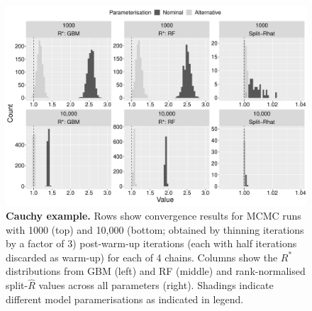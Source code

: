 \documentclass[ba]{imsart}
\numberwithin{equation}{section}
\theoremstyle{plain}
\begin{document}
\begin{figure}[!htb]
	\centerline{\includegraphics[width=1.0\textwidth]{cauchy.pdf}}
	\caption{\textbf{Cauchy example.} Rows show convergence results for MCMC runs with 1000 (top) and 10,000 (bottom; obtained by thinning iterations by a factor of 3) post-warm-up iterations (each with half iterations discarded as warm-up) for each of 4 chains. Columns show the $R^*$ distributions from GBM (left) and RF (middle) and rank-normalised split-$\widehat{R}$ values across all parameters (right). Shadings indicate different model paramerisations as indicated in legend.}
	\label{fig:cauchy}
\end{figure}
\end{document}
